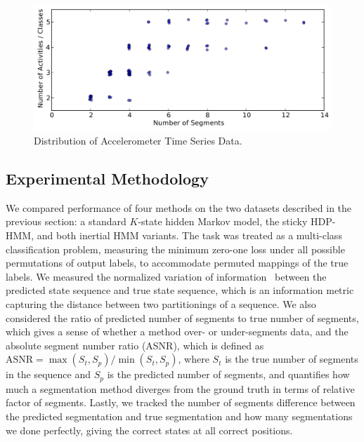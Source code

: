 \documentclass[letterpaper]{article}
\begin{document}
\begin{figure}[htbp]
\setlength{\floatsep}{0cm}
\setlength{\abovecaptionskip}{0pt}
\setlength{\belowcaptionskip}{0cm}
  \centering
    \includegraphics[width=1.\linewidth]{images/distribution_of_dataset_segments.pdf}
    \caption{\small{Distribution of Accelerometer Time Series Data.}}
  \label{fig:distribution}
\end{figure}

\subsection{Experimental Methodology}

We compared performance of four methods on the two datasets described in the previous
section: a standard $K$-state hidden Markov model, the sticky HDP-HMM, and both inertial HMM variants. 
The task was treated as a multi-class classification problem, measuring the minimum
zero-one loss under all possible permutations of output labels, to accommodate
permuted mappings of the true labels. We measured the normalized variation of 
information~\cite{meila} between the predicted state sequence and true state sequence, 
which is an information metric capturing the distance between two
partitionings of a sequence. We also considered the ratio of predicted number of segments 
to true number of segments, which gives a sense of whether a method over- or under-segments data, and the
absolute segment number ratio (ASNR), which is defined as
$\text{ASNR} = \max(S_t, S_p)/\min(S_t, S_p)$, 
where $S_t$ is the true number of segments in the sequence and $S_p$ is the predicted number of segments, and quantifies how much a segmentation method diverges from the ground truth in terms of relative factor of segments. Lastly, we tracked the number of segments difference between the predicted segmentation and true segmentation and how many segmentations we done perfectly, giving the correct states at all correct positions.
\end{document}
